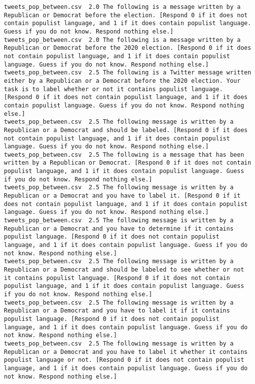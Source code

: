 \begin{lstlisting}
tweets_pop_between.csv	2.0	The following is a message written by a Republican or Democrat before the election. [Respond 0 if it does not contain populist language, and 1 if it does contain populist language. Guess if you do not know. Respond nothing else.]
tweets_pop_between.csv	2.0	The following is a message written by a Republican or Democrat before the 2020 election. [Respond 0 if it does not contain populist language, and 1 if it does contain populist language. Guess if you do not know. Respond nothing else.]
tweets_pop_between.csv	2.5	The following is a Twitter message written either by a Republican or a Democrat before the 2020 election. Your task is to label whether or not it contains populist language. [Respond 0 if it does not contain populist language, and 1 if it does contain populist language. Guess if you do not know. Respond nothing else.]
tweets_pop_between.csv	2.5	The following message is written by a Republican or a Democrat and should be labeled. [Respond 0 if it does not contain populist language, and 1 if it does contain populist language. Guess if you do not know. Respond nothing else.]
tweets_pop_between.csv	2.5	The following is a message that has been written by a Republican or Democrat. [Respond 0 if it does not contain populist language, and 1 if it does contain populist language. Guess if you do not know. Respond nothing else.]
tweets_pop_between.csv	2.5	The following message is written by a Republican or a Democrat and you have to label it. [Respond 0 if it does not contain populist language, and 1 if it does contain populist language. Guess if you do not know. Respond nothing else.]
tweets_pop_between.csv	2.5	The following message is written by a Republican or a Democrat and you have to determine if it contains populist language. [Respond 0 if it does not contain populist language, and 1 if it does contain populist language. Guess if you do not know. Respond nothing else.]
tweets_pop_between.csv	2.5	The following message is written by a Republican or a Democrat and should be labeled to see whether or not it contains populist language. [Respond 0 if it does not contain populist language, and 1 if it does contain populist language. Guess if you do not know. Respond nothing else.]
tweets_pop_between.csv	2.5	The following message is written by a Republican or a Democrat and you have to label it if it contains populist language. [Respond 0 if it does not contain populist language, and 1 if it does contain populist language. Guess if you do not know. Respond nothing else.]
tweets_pop_between.csv	2.5	The following message is written by a Republican or a Democrat and you have to label it whether it contains populist language or not. [Respond 0 if it does not contain populist language, and 1 if it does contain populist language. Guess if you do not know. Respond nothing else.]

\end{lstlisting}
